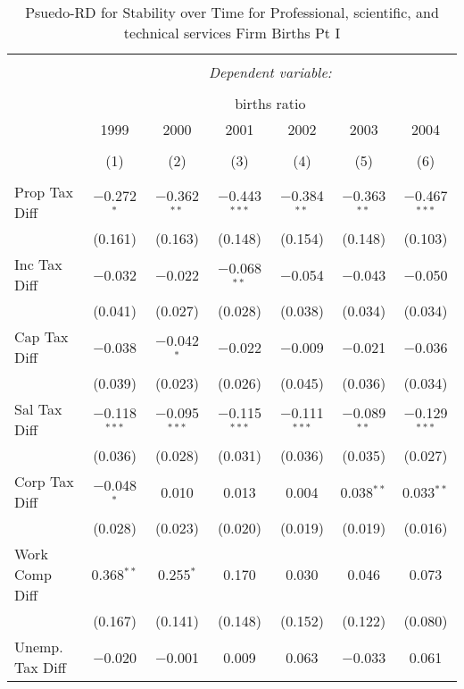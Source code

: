 
\begin{table}[!htbp] \centering 
  \caption{Psuedo-RD for Stability over Time for  Professional, scientific, and technical services Firm Births Pt I} 
  \label{54year} 
\small 
\begin{tabular}{@{\extracolsep{5pt}}lcccccc} 
\\[-1.8ex]\hline 
\hline \\[-1.8ex] 
 & \multicolumn{6}{c}{\textit{Dependent variable:}} \\ 
\cline{2-7} 
\\[-1.8ex] & \multicolumn{6}{c}{births ratio} \\ 
 & 1999 & 2000 & 2001 & 2002 & 2003 & 2004 \\ 
\\[-1.8ex] & (1) & (2) & (3) & (4) & (5) & (6)\\ 
\hline \\[-1.8ex] 
 Prop Tax Diff & $-$0.272$^{*}$ & $-$0.362$^{**}$ & $-$0.443$^{***}$ & $-$0.384$^{**}$ & $-$0.363$^{**}$ & $-$0.467$^{***}$ \\ 
  & (0.161) & (0.163) & (0.148) & (0.154) & (0.148) & (0.103) \\ 
  Inc Tax Diff & $-$0.032 & $-$0.022 & $-$0.068$^{**}$ & $-$0.054 & $-$0.043 & $-$0.050 \\ 
  & (0.041) & (0.027) & (0.028) & (0.038) & (0.034) & (0.034) \\ 
  Cap Tax Diff & $-$0.038 & $-$0.042$^{*}$ & $-$0.022 & $-$0.009 & $-$0.021 & $-$0.036 \\ 
  & (0.039) & (0.023) & (0.026) & (0.045) & (0.036) & (0.034) \\ 
  Sal Tax Diff & $-$0.118$^{***}$ & $-$0.095$^{***}$ & $-$0.115$^{***}$ & $-$0.111$^{***}$ & $-$0.089$^{**}$ & $-$0.129$^{***}$ \\ 
  & (0.036) & (0.028) & (0.031) & (0.036) & (0.035) & (0.027) \\ 
  Corp Tax Diff & $-$0.048$^{*}$ & 0.010 & 0.013 & 0.004 & 0.038$^{**}$ & 0.033$^{**}$ \\ 
  & (0.028) & (0.023) & (0.020) & (0.019) & (0.019) & (0.016) \\ 
  Work Comp Diff & 0.368$^{**}$ & 0.255$^{*}$ & 0.170 & 0.030 & 0.046 & 0.073 \\ 
  & (0.167) & (0.141) & (0.148) & (0.152) & (0.122) & (0.080) \\ 
  Unemp. Tax Diff & $-$0.020 & $-$0.001 & 0.009 & 0.063 & $-$0.033 & 0.061 \\ 

\end{tabular}
\end{table}
